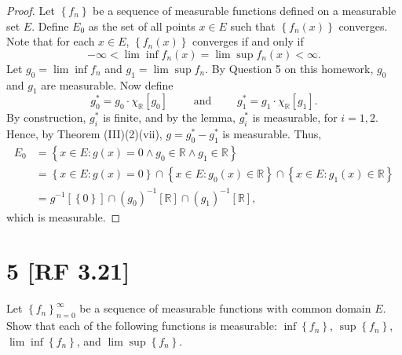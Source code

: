 \documentclass[12pt]{article}
\begin{document}
\begin{proof}
Let $\left\{ f_{n} \right\}$ be a sequence of measurable functions defined on a measurable set $E$. Define $E_{0}$ as the set of all points $x \in E$
such that $\left\{ f_{n}(x) \right\}$ converges. Note that for each $x \in E$, $\left\{ f_{n}(x) \right\}$ converges if and only if 
\[ -\infty < \lim\inf f_{n}(x) = \lim\sup f_{n}(x) < \infty. \]
Let $g_{0} = \lim\inf f_{n}$ and $g_{1} = \lim\sup f_{n}$. By Question 5 on this homework, $g_{0}$ and $g_{1}$ are measurable. Now define 
\[ g_{0}^{*} = g_{0}\cdot \chi_{\mathbb{R}}[g_{0}] \qquad \text{ and } \qquad g_{1}^{*} = g_{1}\cdot \chi_{\mathbb{R}}[g_{1}]. \]
By construction, $g_{i}^{*}$ is finite, and by the lemma, $g_{i}^{*}$ is measurable, for $i = 1,2$. Hence, by Theorem (III)(2)(vii), $g = g_{0}^{*} - g_{1}^{*}$ is measurable. Thus,
\begin{align*}
E_{0} & = \left\{ x \in E : g(x) = 0 \wedge g_{0} \in \mathbb{R} \wedge g_{1} \in \mathbb{R} \right\} \\
& = \left\{ x \in E : g(x) = 0 \right\} \cap \left\{ x \in E : g_{0}(x) \in \mathbb{R} \right\} \cap \left\{ x \in E : g_{1}(x) \in \mathbb{R}
\right\} \\ 
& = g^{-1}\left[ \left\{ 0 \right\} \right] \cap (g_{0})^{-1}\left[ \mathbb{R} \right] \cap \left( g_{1} \right)^{-1}\left[ \mathbb{R}
\right], 
\end{align*}
which is measurable.
\end{proof}


\newpage
\section*{5 [RF 3.21]}
Let $\left\{ f_{n} \right\}_{n=0}^{\infty}$ be a sequence of measurable functions with common domain $E$. Show that each of the following functions is
measurable: $\inf\left\{ f_{n} \right\}$, $\sup\left\{ f_{n} \right\}$, $\lim\inf\left\{ f_{n} \right\}$, and $\lim\sup\left\{ f_{n} \right\}$.
\end{document}
